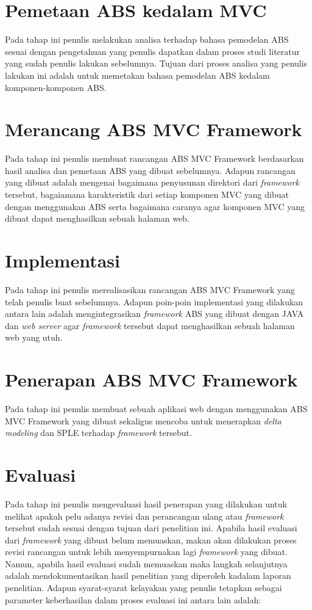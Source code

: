 \section{Pemetaan ABS kedalam MVC}

Pada tahap ini penulis melakukan analisa terhadap bahasa pemodelan ABS sesuai dengan pengetahuan yang penulis dapatkan dalam proses studi literatur yang sudah penulis lakukan sebelumnya. Tujuan dari proses analisa yang penulis lakukan ini adalah untuk memetakan bahasa pemodelan ABS kedalam komponen-komponen ABS.

\section{Merancang ABS MVC Framework}

Pada tahap ini penulis membuat rancangan ABS MVC Framework berdasarkan hasil analisa dan pemetaan ABS yang dibuat sebelumnya. Adapun rancangan yang dibuat adalah mengenai bagaimana penyusunan direktori dari \textit{framework} tersebut, bagaiamana karakteristik dari setiap komponen MVC yang dibuat dengan menggunakan ABS serta bagaimana caranya agar komponen MVC yang dibuat dapat menghasilkan sebuah halaman web.

\section{Implementasi}

Pada tahap ini penulis merealisasikan rancangan ABS MVC Framework yang telah penulis buat sebelumnya. Adapun poin-poin implementasi yang dilakukan antara lain adalah mengintegrasikan \textit{framework} ABS yang dibuat dengan JAVA dan \textit{web server} agar \textit{framework} tersebut dapat menghasilkan sebuah halaman web yang utuh.

\section{Penerapan ABS MVC Framework}

Pada tahap ini penulis membuat sebuah aplikasi web dengan menggunakan ABS MVC Framework yang dibuat sekaligus mencoba untuk menerapkan \textit{delta modeling} dan SPLE terhadap \textit{framework} tersebut.

\section{Evaluasi}

Pada tahap ini penulis mengevaluasi hasil penerapan yang dilakukan untuk melihat apakah pelu adanya revisi dan perancangan ulang atau \textit{framework} tersebut sudah sesuai dengan tujuan dari penelitian ini. Apabila hasil evaluasi dari \textit{framework} yang dibuat belum memuaskan, makan akan dilakukan proses revisi rancangan untuk lebih menyempurnakan lagi \textit{framework} yang dibuat. Namun, apabila hasil evaluasi sudah memuaskan maka langkah selanjutnya adalah mendokumentasikan hasil penelitian yang diperoleh kadalam laporan penelitian. Adapun syarat-syarat kelayakan yang penulis tetapkan sebagai parameter keberhasilan dalam proses evaluasi ini antara lain adalah:

